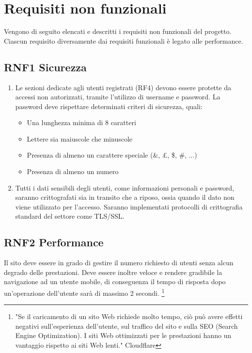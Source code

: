 \documentclass[a4paper,12pt]{article}
\begin{document}
\section{Requisiti non funzionali}

Vengono di seguito elencati e descritti i requisiti non funzionali del progetto. Ciascun requisito diversamente dai requisiti funzionali è legato alle performance.

\subsection*{RNF1 Sicurezza}
\begin{enumerate}[label = \alph*]
    \item Le sezioni dedicate agli utenti registrati (RF4) devono essere protette da accessi non autorizzati, tramite l’utilizzo di username e password. 
    La password deve rispettare determinati criteri di sicurezza, quali: 
        \begin{itemize}
            \item Una lunghezza minima di 8 caratteri
            \item Lettere sia maiuscole che minuscole
            \item Presenza di almeno un carattere speciale (\&, £, \$, \#, ...)
            \item Presenza di almeno un numero 
        \end{itemize}
    \item Tutti i dati sensibili degli utenti, come informazioni personali e password, saranno crittografati sia in transito che a riposo, ossia quando il dato non viene utilizzato per l'accesso. Saranno implementati protocolli di crittografia standard del settore come TLS/SSL.
\end{enumerate}


\subsection*{RNF2 Performance}
Il sito deve essere in grado di gestire il numero richiesto di utenti senza alcun degrado delle prestazioni. Deve essere inoltre veloce e rendere gradibile la navigazione ad un utente mobile, di conseguenza il tempo di risposta dopo un'operazione dell'utente sarà di massimo 2 secondi. \footnote{"Se il caricamento di un sito Web richiede molto tempo, ciò può avere effetti negativi sull'esperienza dell'utente, sul traffico del sito e sulla SEO (Search Engine Optimization). I siti Web ottimizzati per le prestazioni hanno un vantaggio rispetto ai siti Web lenti."    Cloudflare }
\end{document}
